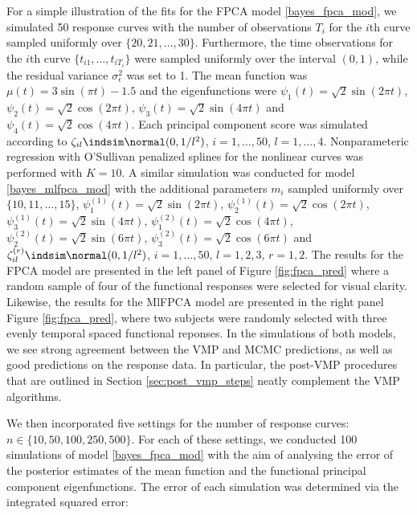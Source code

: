 \documentclass[ba]{imsart}
\numberwithin{equation}{section}
\theoremstyle{plain}
\def\sigsqeps{\sigma^2_{\epsilon}}
\begin{document}
For a simple illustration of the fits for the FPCA model \eqref{bayes_fpca_mod},
we simulated 50 response curves with the number
of observations $T_i$ for the $i$th curve sampled uniformly over $\{ 20, 21, \dots, 30 \}$. Furthermore, the time
observations for the $i$th curve $\{ t_{i1}, \dots, t_{i T_i} \}$ were sampled uniformly over the interval $(0, 1)$,
while the residual variance $\sigsqeps$ was set to 1. The mean function was $\mu (t) = 3 \sin (\pi t) - 1.5$
and the eigenfunctions were $\psi_1 (t) = \sqrt{2} \sin (2 \pi t)$, $\psi_2 (t) = \sqrt{2} \cos (2 \pi t)$,
$\psi_3 (t) = \sqrt{2} \sin (4 \pi t)$ and $\psi_4 (t) = \sqrt{2} \cos (4 \pi t)$.
Each principal component score was simulated according to
$\zeta_{il} \indsim \normal (0, 1/l^2)$, $i = 1, \dots, 50$, $l = 1, \dots, 4$.
Nonparameteric regression with O'Sullivan penalized splines for the nonlinear curves was performed
with $K = 10$. A similar simulation was conducted for model \eqref{bayes_mlfpca_mod} with the additional
parameters $m_i$ sampled uniformly over $\{ 10, 11, \dots, 15 \}$,
$\psi^{(1)}_1 (t) = \sqrt{2} \sin (2 \pi t)$, $\psi^{(1)}_2 (t) = \sqrt{2} \cos (2 \pi t)$, $\psi^{(1)}_3 (t) = \sqrt{2} \sin (4 \pi t)$,
$\psi^{(2)}_1 (t) = \sqrt{2} \cos (4 \pi t)$, $\psi^{(2)}_2 (t) = \sqrt{2} \sin (6 \pi t)$, $\psi^{(2)}_3 (t) = \sqrt{2} \cos (6 \pi t)$
and $\zeta^{(r)}_{il} \indsim \allowbreak \normal (0, 1/l^2)$, $i = 1, \dots, 50$, $l = 1, 2, 3$, $r = 1, 2$. The results for the FPCA
model are presented in the left panel of Figure \ref{fig:fpca_pred} where a random sample of
four of the functional responses were selected for visual clarity. Likewise, the results for the MlFPCA model
are presented in the right panel Figure \ref{fig:fpca_pred}, where two subjects were randomly selected
with three evenly temporal spaced functional reponses.
In the simulations of both models, we see strong agreement between
the VMP and MCMC predictions, as well as good predictions on the response data.
In particular, the post-VMP procedures that are outlined in Section \ref{sec:post_vmp_steps} neatly
complement the VMP algorithms.

We then incorporated five settings for the number of response curves: $n \in \{ 10, 50, \allowbreak 100, 250, 500 \}$. For each of these
settings, we conducted 100 simulations of model \eqref{bayes_fpca_mod} with the aim of analysing the error of
the posterior estimates of the mean function and the functional principal
component eigenfunctions. The error of each simulation was determined via the
integrated squared error:
\end{document}

